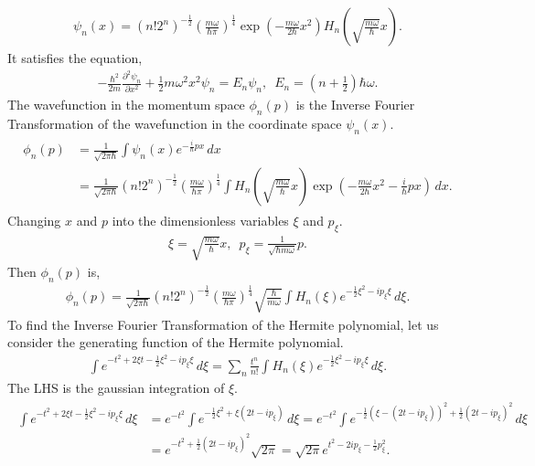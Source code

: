 \documentclass[floatfix,nofootinbib,superscriptaddress,fleqn]{revtex4-2}
\begin{document}
 \begin{align}\label{eq:5-1}
   \psi_n(x)=(n!2^n)^{-\frac{1}{2}}
   \left(\frac{m\omega}{\hbar\pi}\right)^{\frac{1}{4}}
   \exp\left(-\frac{m\omega}{2\hbar}x^2\right)
   H_n\left(\sqrt{\frac{m\omega}{\hbar}}x\right).
 \end{align}
 It satisfies the equation,
\begin{align}\label{eq:5-2}
  -\frac{\hbar^2}{2m}\frac{\partial^2\psi_n}{\partial x^2}
  +\frac{1}{2}m\omega^2x^2\psi_n = E_n\psi_n,\,\,\,
  E_n = \left(n+\frac{1}{2}\right)\hbar\omega.
\end{align}
The wavefunction in the momentum space $\phi_n(p)$ 
is the Inverse Fourier Transformation 
of the wavefunction in the coordinate space $\psi_n(x)$.
\begin{align}
  \begin{split}
    \phi_n(p) &= \frac{1}{\sqrt{2\pi\hbar}}
    \int \psi_n(x) e^{-\frac{i}{\hbar} px} \, dx \\
    &= \frac{1}{\sqrt{2\pi\hbar}}(n!2^n)^{-\frac{1}{2}}
    \left(\frac{m\omega}{\hbar\pi}\right)^{\frac{1}{4}}
    \int H_n\left(\sqrt{\frac{m\omega}{\hbar}}x\right)
    \exp{\left( -\frac{m\omega}{2\hbar}x^2
    -\frac{i}{\hbar} px \right)}\, dx.
  \end{split}
\end{align}
Changing $x$ and $p$ into the dimensionless variables 
$\xi$ and $p_{\xi}$.
\begin{align}
  \xi = \sqrt{\frac{m\omega }{\hbar }}x,\,\,\,
  p_\xi = \frac{1}{\sqrt{\hbar m \omega}}p.
\end{align}
Then $\phi_n(p)$ is,
\begin{align}
  \phi_n(p) = \frac{1}{\sqrt{2\pi\hbar}}(n!2^n)^{-\frac{1}{2}}
  \left(\frac{m\omega}{\hbar\pi}\right)^{\frac{1}{4}}
  \sqrt{\frac{\hbar }{m\omega }}
  \int H_n\left( \xi \right)
  e^{-\frac{1}{2}\xi^2 -i p_\xi\xi }\, d\xi.
\end{align}
To find the Inverse Fourier Transformation of the Hermite polynomial,
let us consider the generating function of the Hermite polynomial.
\begin{align}\label{eq:5-3}
  \int e^{-t^2 +2\xi t-\frac{1}{2}\xi^2 -i p_\xi\xi } \,d\xi
  =\sum_n \frac{t^n}{n!}\int H_n(\xi)
  e^{-\frac{1}{2}\xi^2 -i p_\xi\xi }\, d\xi.
\end{align}
The LHS is the gaussian integration of $\xi$.
\begin{align}
  \begin{split}
    \int e^{-t^2 +2\xi t-\frac{1}{2}\xi^2 -i p_\xi\xi } \,d\xi
    &=e^{-t^2 }\int e^{-\frac{1}{2}\xi^2+\xi(2t -i p_\xi) } \,d\xi
    =e^{-t^2 }\int e^{-\frac{1}{2}(\xi-(2t -i p_\xi))^2
    +\frac{1}{2}(2t-ip_\xi)^2 } \,d\xi  \\
    &=e^{-t^2 +\frac{1}{2}(2t-ip_\xi)^2}\sqrt{2\pi}
    =\sqrt{2\pi}e^{t^2-2ip_\xi-\frac{1}{2}p^2_\xi}.
  \end{split}
\end{align}
\end{document}
